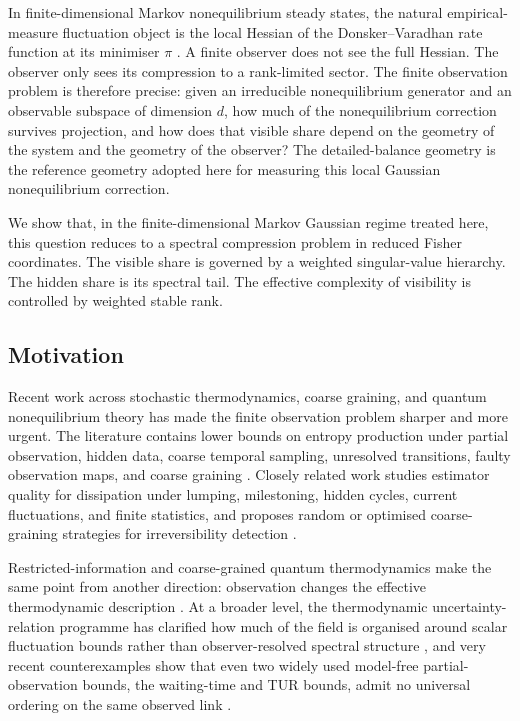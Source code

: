\documentclass[11pt,a4paper]{article}
\numberwithin{equation}{section}
\theoremstyle{thmcompact}
\theoremstyle{remark}
\begin{document}
In finite-dimensional Markov nonequilibrium steady states, the natural empirical-measure fluctuation object is the local Hessian of the Donsker--Varadhan rate function at its minimiser \(\pi\) \cite{DonskerVaradhan1975a,DonskerVaradhan1975b,Touchette2009,LebowitzSpohn1999}. A finite observer does not see the full Hessian. The observer only sees its compression to a rank-limited sector. The finite observation problem is therefore precise: given an irreducible nonequilibrium generator and an observable subspace of dimension \(d\), how much of the nonequilibrium correction survives projection, and how does that visible share depend on the geometry of the system and the geometry of the observer? The detailed-balance geometry is the reference geometry adopted here for measuring this local Gaussian nonequilibrium correction.

We show that, in the finite-dimensional Markov Gaussian regime treated here, this question reduces to a spectral compression problem in reduced Fisher coordinates. The visible share is governed by a weighted singular-value hierarchy. The hidden share is its spectral tail. The effective complexity of visibility is controlled by weighted stable rank.

\subsection{Motivation}

Recent work across stochastic thermodynamics, coarse graining, and quantum nonequilibrium theory has made the finite observation problem sharper and more urgent. The literature contains lower bounds on entropy production under partial observation, hidden data, coarse temporal sampling, unresolved transitions, faulty observation maps, and coarse graining \cite{BaiesiNishiyamaFalasco2023,FritzErtelSeifert2024,Harunari2024,vanderMeerSaito2025,ErtelSeifert2025,Ehrich2021,DeguntherVanDerMeerSeifert2024,Esposito2012}. Closely related work studies estimator quality for dissipation under lumping, milestoning, hidden cycles, current fluctuations, and finite statistics, and proposes random or optimised coarse-graining strategies for irreversibility detection \cite{BlomSongVougaGodecMakarov2025,BaoOhgaIto2025,GingrichRotskoffHorowitz2017,YuLeightonLynn2025,TezaStellaGrandPre2025,TezaStella2020}.

Restricted-information and coarse-grained quantum thermodynamics make the same point from another direction: observation changes the effective thermodynamic description \cite{RubinoBruknerManzano2025,PernambucoCeleri2026,LacerdaBettmannGoold2025,BettmannGoold2025,Wirth2025}. At a broader level, the thermodynamic uncertainty-relation programme has clarified how much of the field is organised around scalar fluctuation bounds rather than observer-resolved spectral structure \cite{BaratoSeifert2015,HorowitzGingrich2020}, and very recent counterexamples show that even two widely used model-free partial-observation bounds, the waiting-time and TUR bounds, admit no universal ordering on the same observed link \cite{Gu2026}.
\end{document}
